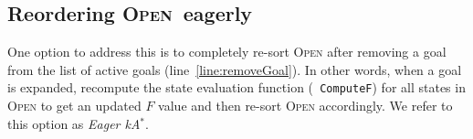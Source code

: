 \documentclass{aicom2e}
\newcommand{\kgs}{$k$GP}
\newcommand{\kastar}{kA$^*$}
\newcommand{\kastarmin}{kA$^*_{min}$}
\newcommand{\kastarmax}{kA$^*_{max}$}
\newcommand{\open}{\textsc{Open}}
\begin{document}







\subsection{Reordering \open\ eagerly}

One option to address this is to completely re-sort \open{} after removing a
goal from the list of active goals (line~\ref{line:removeGoal}). In other
words, when a goal is expanded, recompute the state evaluation function ({\tt
ComputeF}) for all states in \open{} to get an updated $F$ value and then
re-sort \open{} accordingly. We refer to this option as {\em Eager \kastar{}}.









\end{document}

